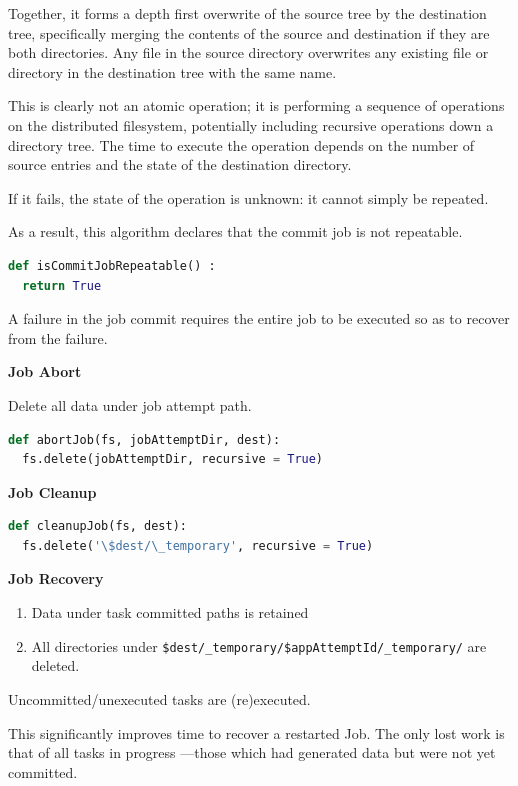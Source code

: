 \documentclass[conference]{IEEEtran}
\begin{document}
Together, it forms a depth first overwrite of the source tree by the destination
tree, specifically merging the contents of the source and destination if they
are both directories.
Any file in the source directory overwrites any existing file or directory
in the destination tree with the same name.


This is clearly not an atomic operation;
it is performing a sequence of operations on the distributed filesystem,
potentially including recursive operations down a directory tree.
The time to execute the operation depends on the number of source entries
and the state of the destination directory.

If it fails, the state of the operation is unknown: it cannot simply
be repeated.

As a result, this algorithm declares that the commit job is not repeatable.

\begin{lstlisting}[language=Python]
def isCommitJobRepeatable() :
  return True
\end{lstlisting}

A failure in the job commit requires
the entire job to be executed so as to recover from the failure.


\textbf{Job Abort}

Delete all data under job attempt path.

\begin{lstlisting}[language=Python]
def abortJob(fs, jobAttemptDir, dest):
  fs.delete(jobAttemptDir, recursive = True)
\end{lstlisting}

\textbf{Job Cleanup}

\begin{lstlisting}[language=Python]
def cleanupJob(fs, dest):
  fs.delete('\$dest/\_temporary', recursive = True)
\end{lstlisting}


\textbf{Job Recovery}

\begin{enumerate}

\item Data under task committed paths is retained
\item All directories under \texttt{\$dest/\_temporary/\$appAttemptId/\_temporary/}
are deleted.
\end{enumerate}

Uncommitted/unexecuted tasks are (re)executed.

This significantly improves time to recover a restarted Job.
The only lost work is that of all tasks in progress ---those which had generated
data but were not yet committed.
\end{document}

